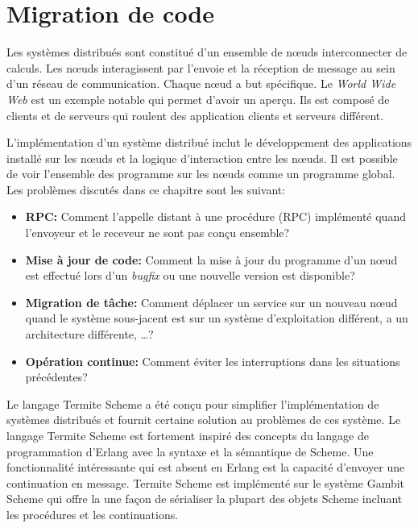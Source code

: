 \chapter{Migration de code}
\label{ch:task_migration}

Les systèmes distribués sont constitué d'un ensemble de nœuds interconnecter
de calculs. Les nœuds interagissent par l'envoie et la réception de message
au sein d'un réseau de communication. Chaque nœud a but spécifique. Le
\textit{World Wide Web} est un exemple notable qui permet d'avoir un aperçu.
Ils est composé de clients et de serveurs qui roulent des application
clients et serveurs différent.

L'implémentation d'un système distribué inclut le développement des applications
installé sur les nœuds et la logique d'interaction entre les nœuds. Il est
possible de voir l'ensemble des programme sur les nœuds comme un programme
global. Les problèmes discutés dans ce chapitre sont les suivant:

\begin{itemize}

  \item {\bf RPC:} Comment l'appelle distant à une procédure (RPC)
    implémenté quand l'envoyeur et le receveur ne sont pas conçu
    ensemble?

  \item {\bf Mise à jour de code:} Comment la mise à jour du programme d'un
    nœud est effectué lors d'un \textit{bugfix} ou une nouvelle
    version est disponible?

  \item {\bf Migration de tâche:} Comment déplacer un service sur un nouveau
    nœud quand le système sous-jacent est sur un système d'exploitation
    différent, a un architecture différente, \dots?

  \item {\bf Opération continue:} Comment éviter les interruptions dans les
    situations précédentes?

\end{itemize}

Le langage Termite Scheme\cite{DBLP:conf/erlang/Germain06} a été conçu
pour simplifier l'implémentation de systèmes distribués et fournit
certaine solution au problèmes de ces système. Le langage Termite Scheme est
fortement inspiré des concepts du langage de programmation d'Erlang avec la
syntaxe et la sémantique de Scheme. Une fonctionnalité intéressante qui est
absent en Erlang est la capacité d'envoyer une continuation en message.
Termite Scheme est implémenté sur le système Gambit Scheme qui offre la
une façon de sérialiser la plupart des objets Scheme incluant les
procédures et les continuations.

